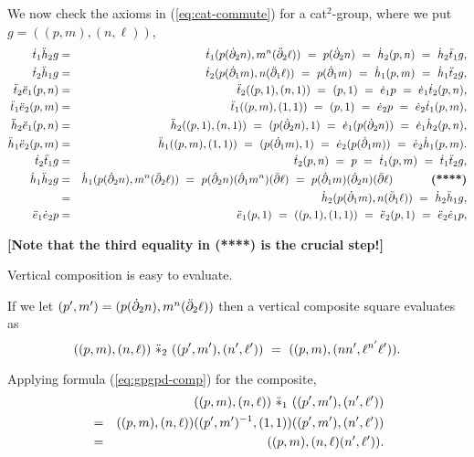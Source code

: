 \newpage
We now check the axioms  in (\ref{eq:cat-commute}) for a cat$^2$-group, 
where we put $g = ((p,m),(n,\ell))$, 
\begin{eqnarray*}
\dtto\ddhht g
 &=& \dtto(p(\dbdyt n), m^n(\ddbdyt\ell)) 
 ~=~ p(\dbdyt n) 
 ~=~ \dhht(p,n)
 ~=~ \dhht\ddtto g, \\
\dttt\ddhho g
 &=& \dttt(p(\dbdyo m), n(\ddbdyo\ell)) 
 ~=~ p(\dbdyo m)  
 ~=~ \dhho(p,m)
 ~=~ \dhho\ddttt g, \\
\ddttt\ddeeo (p,n) 
 &=& \ddttt((p,1),(n,1)) 
 ~=~ (p,1) 
 ~=~ \deeo p 
 ~=~ \deeo\dttt (p,n), \\
\ddtto\ddeet (p,m) 
 &=& \ddtto((p,m),(1,1)) 
 ~=~ (p,1) 
 ~=~ \deet p 
 ~=~ \deet\dtto (p,m), \\
\ddhht\ddeeo (p,n) 
 &=& \ddhht((p,1),(n,1)) 
 ~=~ (p(\dbdyt n),1) 
 ~=~ \deeo(p(\dbdyt n)) 
 ~=~ \deeo\dhht (p,n), \\
\ddhho\ddeet (p,m) 
 &=& \ddhho((p,m),(1,1)) 
 ~=~ (p(\dbdyo m),1) 
 ~=~ \deet(p(\dbdyo m)) 
 ~=~ \deet\dhho (p,m). \\
\dttt\ddtto g 
 &=& \dttt(p,n)
 ~=~ p 
 ~=~ \dtto(p,m) 
 ~=~ \dtto\ddttt g, \\ 
\dhho\ddhht g
 &=& \dhho (p(\dbdyt n), m^n(\ddbdyt\ell)) 
 ~=~ p(\dbdyt n)(\dbdyo m^n)(\barbdy\ell) 
 ~=~ p(\dbdyo m)(\dbdyt n)(\barbdy\ell) \hspace*{12mm}\mbox{{\bf (****)}} \\
 &=& \dhht(p(\dbdyo m), n(\ddbdyo\ell)) 
 ~=~\dhht\ddhho g, \\
\ddeeo\deet p 
 &=& \ddeeo(p,1) 
 ~=~ ((p,1),(1,1)) 
 ~=~ \ddeet(p,1) 
 ~=~ \ddeet\deeo p, \\
\end{eqnarray*}

\vspace*{-6mm}\noindent
{\bf [Note that the third equality in (****) is the crucial step!]}

\medskip\noindent
Vertical composition is easy to evaluate.
\begin{lem}
If we let  $(p',m') = (p(\dot{\partial}_2 n),m^n(\ddot{\partial}_2\ell))$  
then a vertical composite square evaluates as 
$$
((p,m),(n,\ell)) ~\ddot{\ast}_2~ ((p',m'),(n',\ell'))
~=~
((p,m),(nn',\ell^{n'}\ell')).
$$
\end{lem}
\begin{pf}
Applying formula (\ref{eq:gpgpd-comp}) for the composite,
\begin{eqnarray*}
 & &  ((p,m),(n,\ell)) ~\ddot{\ast}_1~ ((p',m'),(n',\ell')) \\
 &=&  ((p,m),(n,\ell))((p',m')^{-1},(1,1))((p',m'),(n',\ell')) \\
 &=&  ((p,m),(n,\ell)(n',\ell')).
\end{eqnarray*}
\end{pf}

